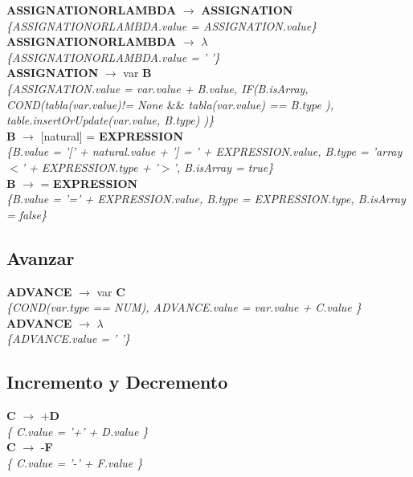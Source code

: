 \documentclass[10pt,a4paper]{article}
\begin{document}
\textbf{ASSIGNATIONORLAMBDA} $\rightarrow$ \textbf{ASSIGNATION} \\
\textit{\{ASSIGNATIONORLAMBDA.value = ASSIGNATION.value\}} \\

\textbf{ASSIGNATIONORLAMBDA} $\rightarrow$ $\lambda$ \\
\textit{\{ASSIGNATIONORLAMBDA.value = ' '\}} \\

\textbf{ASSIGNATION} $\rightarrow$ var \textbf{B} \\
\textit{\{ASSIGNATION.value = var.value + B.value, 
IF(B.isArray, COND(tabla(var.value)!= None $\&\&$ tabla(var.value) == B.type ), table.insertOrUpdate(var.value, B.type) )\}} \\

\textbf{B} $\rightarrow$ [natural] = \textbf{EXPRESSION}  \\
\textit{\{B.value = '[' + natural.value + '] = ' + EXPRESSION.value, B.type = 'array$<$' + EXPRESSION.type + '$>$', B.isArray = true\}} \\

\textbf{B} $\rightarrow$ = \textbf{EXPRESSION} \\
\textit{\{B.value = '=' + EXPRESSION.value, B.type = EXPRESSION.type, B.isArray = false\}} \\

\subsection{Avanzar}
\textbf{ADVANCE} $\rightarrow$ var \textbf{C} \\
\textit{\{COND(var.type == NUM), ADVANCE.value = var.value + C.value  \}} \\

\textbf{ADVANCE} $\rightarrow$ $\lambda$ \\
\textit{\{ADVANCE.value = ' '\}} \\

\subsection{Incremento y Decremento}
\textbf{C} $\rightarrow$ +\textbf{D} \\ 
\textit{\{ C.value = '+' + D.value   \}} \\

\textbf{C} $\rightarrow$ -\textbf{F} \\
\textit{\{ C.value = '-' + F.value   \}} \\
\end{document}
